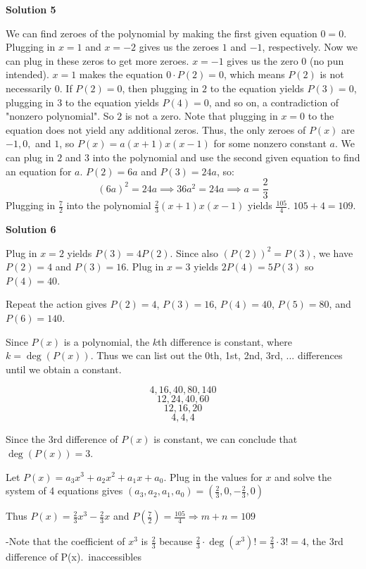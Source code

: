 \begin{enumerate}
 



\textbf{Solution 5}

We can find zeroes of the polynomial by making the first given equation $0 = 0$. Plugging in $x = 1$ and $x = -2$ gives us the zeroes $1$ and $-1$, respectively. Now we can plug in these zeros to get more zeroes. $x = -1$ gives us the zero $0$ (no pun intended). $x = 1$ makes the equation $0 \cdot P(2) = 0$, which means $P(2)$ is not necessarily $0$. If $P(2) = 0$, then plugging in $2$ to the equation yields $P(3) = 0$, plugging in $3$ to the equation yields $P(4) = 0$, and so on, a contradiction of "nonzero polynomial". So $2$ is not a zero. Note that plugging in $x = 0$ to the equation does not yield any additional zeros. Thus, the only zeroes of $P(x)$ are $-1, 0,$ and $1$, so $P(x) = a(x + 1)x(x - 1)$ for some nonzero constant $a$. We can plug in $2$ and $3$ into the polynomial and use the second given equation to find an equation for $a$. $P(2) = 6a$ and $P(3) = 24a$, so:
 \[(6a)^2  = 24a \implies 36a^2 = 24a \implies a = \frac23\]Plugging in $\frac72$ into the polynomial $\frac23(x + 1)x(x - 1)$ yields $\frac{105}{4}$. $105 + 4 = \boxed{109}$.

 



\textbf{Solution 6}

Plug in $x=2$ yields $P(3)=4P(2)$. Since also $(P(2))^2=P(3)$, we have $P(2)=4$ and $P(3)=16$. Plug in $x=3$ yields $2P(4)=5P(3)$ so $P(4)=40$. 

 Repeat the action gives $P(2)=4$, $P(3)=16$, $P(4)=40$, $P(5)=80$, and $P(6)=140$.

 Since $P(x)$ is a polynomial, the $k$th difference is constant, where $k=\deg(P(x))$. Thus we can list out the 0th, 1st, 2nd, 3rd, ... differences until we obtain a constant.

 
 \[4,16,40,80,140\]
 \[12,24,40,60\]
 \[12,16,20\]
 \[4,4,4\]

 Since the 3rd difference of $P(x)$ is constant, we can conclude that $\deg(P(x))=3$.

 Let $P(x)=a_3x^3+a_2x^2+a_1x+a_0$. Plug in the values for $x$ and solve the system of 4 equations gives $(a_3,a_2,a_1,a_0)=(\frac{2}{3},0,-\frac{2}{3},0)$

 Thus $P(x)=\frac{2}{3}x^3-\frac{2}{3}x$ and $P(\frac{7}{2})=\frac{105}{4}\Longrightarrow m+n=\boxed{109}$

 -Note that the coefficient of $x^3$ is $\frac{2}{3}$ because $\frac{2}{3}\cdot\deg(x^3)!=\frac{2}{3}\cdot3!=4$, the 3rd difference of P(x).~inaccessibles


\end{enumerate}

